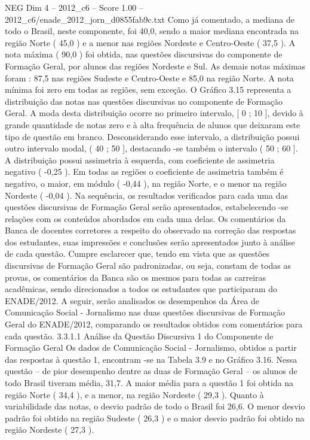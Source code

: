 \begin{textsample}{NEG Dim 4 – 2012\_c6 – Score 1.00 – 2012\_c6/enade\_2012\_jorn\_d0855fab9c.txt}
Como já comentado, a mediana de todo o Brasil, neste componente, foi 40,0, sendo a maior mediana encontrada na região Norte ( 45,0 ) e a menor nas regiões Nordeste e Centro-Oeste ( 37,5 ).
A nota máxima ( 90,0 ) foi obtida, nas questões discursivas do componente de Formação Geral, por alunos das regiões Nordeste e Sul.
As demais notas máximas foram : 87,5 nas regiões Sudeste e Centro-Oeste e 85,0 na região Norte.
A nota mínima foi zero em todas as regiões, sem exceção.
O Gráfico 3.15 representa a distribuição das notas nas questões discursivas no componente de Formação Geral.
A moda desta distribuição ocorre no primeiro intervalo, [ 0 ; 10 ], devido à grande quantidade de notas zero e à alta frequência de alunos que deixaram este tipo de questão em branco.
Desconsiderando esse intervalo, a distribuição possui outro intervalo modal, ( 40 ; 50 ], destacando -se também o intervalo ( 50 ; 60 ].
A distribuição possui assimetria à esquerda, com coeficiente de assimetria negativo ( -0,25 ).
Em todas as regiões o coeficiente de assimetria também é negativo, o maior, em módulo ( -0,44 ), na região Norte, e o menor na região Nordeste ( -0,04 ).
Na sequência, os resultados verificados para cada uma das questões discursivas de Formação Geral serão apresentados, estabelecendo -se relações com os conteúdos abordados em cada uma delas.
Os comentários da Banca de docentes corretores a respeito do observado na correção das respostas dos estudantes, suas impressões e conclusões serão apresentados junto à análise de cada questão.
Cumpre esclarecer que, tendo em vista que as questões discursivas de Formação Geral são padronizadas, ou seja, constam de todas as provas, os comentários da Banca são os mesmos para todas as carreiras acadêmicas, sendo direcionados a todos os estudantes que participaram do ENADE/2012.
A seguir, serão analisados os desempenhos da Área de Comunicação Social - Jornalismo nas duas questões discursivas de Formação Geral do ENADE/2012, comparando os resultados obtidos com comentários para cada questão. 3.3.1.1 Análise da Questão Discursiva 1 do Componente de Formação Geral Os dados de Comunicação Social - Jornalismo, obtidos a partir das respostas à questão 1, encontram -se na Tabela 3.9 e no Gráfico 3.16.
Nessa questão – de pior desempenho dentre as duas de Formação Geral – os alunos de todo Brasil tiveram média, 31,7.
A maior média para a questão 1 foi obtida na região Norte ( 34,4 ), e a menor, na região Nordeste ( 29,3 ).
Quanto à variabilidade das notas, o desvio padrão de todo o Brasil foi 26,6.
O menor desvio padrão foi obtido na região Sudeste ( 26,3 ) e o maior desvio padrão foi obtido na região Nordeste ( 27,3 ).

\end{textsample}
